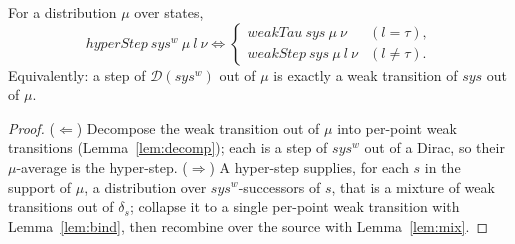 \begin{lemma}
  \label{lem:bridge}
  \leanok
  For a distribution $\mu$ over states,
  \[
    hyperStep\ sys^w\ \mu\ l\ \nu
    \iff
    \begin{cases}
      weakTau\ sys\ \mu\ \nu & (l = \tau),\\
      weakStep\ sys\ \mu\ l\ \nu & (l \ne \tau).
    \end{cases}
  \]
  Equivalently: a step of $\mathcal{D}(sys^w)$ out of $\mu$ is exactly a weak transition of $sys$ out of $\mu$.
\end{lemma}

\begin{proof}\leanok
  ($\Leftarrow$) Decompose the weak transition out of $\mu$ into per-point weak transitions (Lemma~\ref{lem:decomp}); each is a step of $sys^w$ out of a Dirac, so their $\mu$-average is the hyper-step.
  ($\Rightarrow$) A hyper-step supplies, for each $s$ in the support of $\mu$, a distribution over $sys^w$-successors of $s$, that is a mixture of weak transitions out of $\delta_s$; collapse it to a single per-point weak transition with Lemma~\ref{lem:bind}, then recombine over the source with Lemma~\ref{lem:mix}.
\end{proof}
